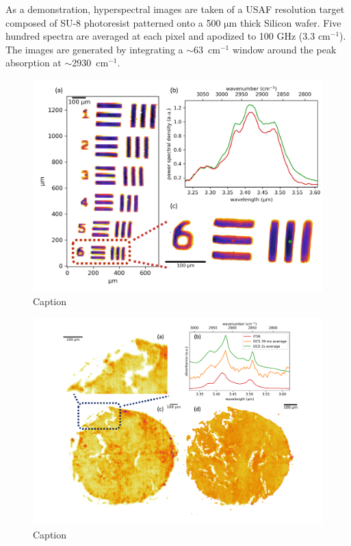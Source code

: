 \documentclass{optica-article}
\begin{document}
As a demonstration, hyperspectral images are taken of a USAF resolution target composed of SU-8 photoresist patterned onto a 500 $\mathrm{\mu m}$ thick Silicon wafer. Five hundred spectra are averaged at each pixel and apodized to 100 GHz (3.3 $\mathrm{cm^{-1}}$). The images are generated by integrating a \mbox{$\sim$63 $\mathrm{cm^{-1}}$} window around the peak absorption at \mbox{$\sim$2930 $\mathrm{cm^{-1}}$}. 


\begin{figure}[h]
    \centering
    \includegraphics[width=\linewidth]{su8_image.png}
    \caption{Caption}
    \label{fig:su8}
\end{figure}

\begin{figure}[h]
    \centering
    \includegraphics[width=\linewidth]{bio_image_w_FTIR_comparison.png}
    \caption{Caption}
    \label{fig:bio}
\end{figure}
\end{document}
